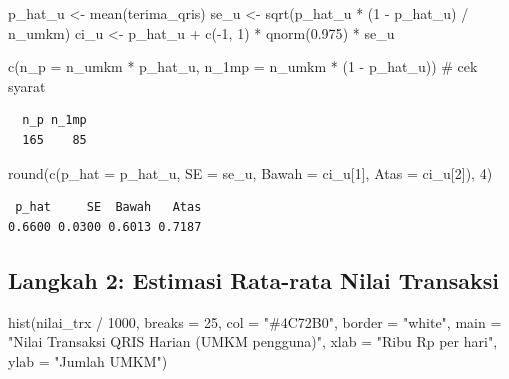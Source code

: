 \documentclass[
  indonesian,
  letterpaper,
]{book}
\newenvironment{Shaded}{\begin{snugshade}}{\end{snugshade}}
\newcommand{\AttributeTok}[1]{\textcolor[rgb]{0.40,0.45,0.13}{#1}}
\newcommand{\CommentTok}[1]{\textcolor[rgb]{0.37,0.37,0.37}{#1}}
\newcommand{\DecValTok}[1]{\textcolor[rgb]{0.68,0.00,0.00}{#1}}
\newcommand{\FloatTok}[1]{\textcolor[rgb]{0.68,0.00,0.00}{#1}}
\newcommand{\FunctionTok}[1]{\textcolor[rgb]{0.28,0.35,0.67}{#1}}
\newcommand{\NormalTok}[1]{\textcolor[rgb]{0.00,0.23,0.31}{#1}}
\newcommand{\OtherTok}[1]{\textcolor[rgb]{0.00,0.23,0.31}{#1}}
\newcommand{\SpecialCharTok}[1]{\textcolor[rgb]{0.37,0.37,0.37}{#1}}
\newcommand{\StringTok}[1]{\textcolor[rgb]{0.13,0.47,0.30}{#1}}
\begin{document}
\begin{Shaded}
\begin{Highlighting}[]
\NormalTok{p\_hat\_u }\OtherTok{\textless{}{-}} \FunctionTok{mean}\NormalTok{(terima\_qris)}
\NormalTok{se\_u    }\OtherTok{\textless{}{-}} \FunctionTok{sqrt}\NormalTok{(p\_hat\_u }\SpecialCharTok{*}\NormalTok{ (}\DecValTok{1} \SpecialCharTok{{-}}\NormalTok{ p\_hat\_u) }\SpecialCharTok{/}\NormalTok{ n\_umkm)}
\NormalTok{ci\_u    }\OtherTok{\textless{}{-}}\NormalTok{ p\_hat\_u }\SpecialCharTok{+} \FunctionTok{c}\NormalTok{(}\SpecialCharTok{{-}}\DecValTok{1}\NormalTok{, }\DecValTok{1}\NormalTok{) }\SpecialCharTok{*} \FunctionTok{qnorm}\NormalTok{(}\FloatTok{0.975}\NormalTok{) }\SpecialCharTok{*}\NormalTok{ se\_u}

\FunctionTok{c}\NormalTok{(}\AttributeTok{n\_p =}\NormalTok{ n\_umkm }\SpecialCharTok{*}\NormalTok{ p\_hat\_u, }\AttributeTok{n\_1mp =}\NormalTok{ n\_umkm }\SpecialCharTok{*}\NormalTok{ (}\DecValTok{1} \SpecialCharTok{{-}}\NormalTok{ p\_hat\_u))   }\CommentTok{\# cek syarat}
\end{Highlighting}
\end{Shaded}

\begin{verbatim}
  n_p n_1mp 
  165    85 
\end{verbatim}

\begin{Shaded}
\begin{Highlighting}[]
\FunctionTok{round}\NormalTok{(}\FunctionTok{c}\NormalTok{(}\AttributeTok{p\_hat =}\NormalTok{ p\_hat\_u, }\AttributeTok{SE =}\NormalTok{ se\_u, }\AttributeTok{Bawah =}\NormalTok{ ci\_u[}\DecValTok{1}\NormalTok{], }\AttributeTok{Atas =}\NormalTok{ ci\_u[}\DecValTok{2}\NormalTok{]), }\DecValTok{4}\NormalTok{)}
\end{Highlighting}
\end{Shaded}

\begin{verbatim}
 p_hat     SE  Bawah   Atas 
0.6600 0.0300 0.6013 0.7187 
\end{verbatim}

\subsection{Langkah 2: Estimasi Rata-rata Nilai
Transaksi}\label{langkah-2-estimasi-rata-rata-nilai-transaksi}

\begin{Shaded}
\begin{Highlighting}[]
\FunctionTok{hist}\NormalTok{(nilai\_trx }\SpecialCharTok{/} \DecValTok{1000}\NormalTok{, }\AttributeTok{breaks =} \DecValTok{25}\NormalTok{, }\AttributeTok{col =} \StringTok{"\#4C72B0"}\NormalTok{, }\AttributeTok{border =} \StringTok{"white"}\NormalTok{,}
     \AttributeTok{main =} \StringTok{"Nilai Transaksi QRIS Harian (UMKM pengguna)"}\NormalTok{, }\AttributeTok{xlab =} \StringTok{"Ribu Rp per hari"}\NormalTok{,}
     \AttributeTok{ylab =} \StringTok{"Jumlah UMKM"}\NormalTok{)}
\end{Highlighting}
\end{Shaded}
\end{document}
